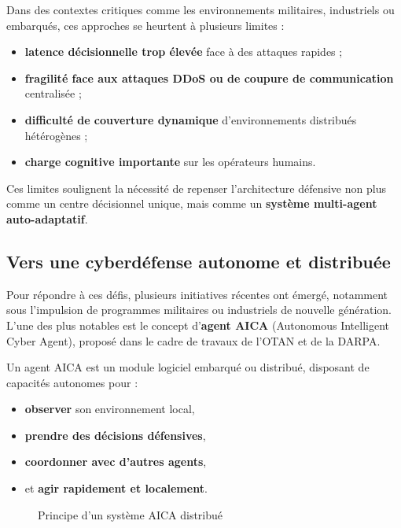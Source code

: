 \documentclass[ twoside,openright,titlepage,numbers=noenddot,headinclude,%
                footinclude=true,cleardoublepage=empty,abstractoff, %
                BCOR=5mm,paper=a4,fontsize=11pt,%
                french,american,%
                ]{scrreprt}
\begin{document}
Dans des contextes critiques comme les environnements militaires, industriels ou embarqués, ces approches se heurtent à plusieurs limites :
\begin{itemize}
    \item \textbf{latence décisionnelle trop élevée} face à des attaques rapides ;
    \item \textbf{fragilité face aux attaques DDoS ou de coupure de communication} centralisée ;
    \item \textbf{difficulté de couverture dynamique} d’environnements distribués hétérogènes ;
    \item \textbf{charge cognitive importante} sur les opérateurs humains.
\end{itemize}

Ces limites soulignent la nécessité de repenser l’architecture défensive non plus comme un centre décisionnel unique, mais comme un \textbf{système multi-agent auto-adaptatif}.

\vspace{0.5em}
\subsection*{Vers une cyberdéfense autonome et distribuée}

Pour répondre à ces défis, plusieurs initiatives récentes ont émergé, notamment sous l’impulsion de programmes militaires ou industriels de nouvelle génération. L’une des plus notables est le concept d’\textbf{agent AICA} (Autonomous Intelligent Cyber Agent), proposé dans le cadre de travaux de l’OTAN et de la DARPA.

Un agent AICA est un module logiciel embarqué ou distribué, disposant de capacités autonomes pour :
\begin{itemize}
    \item \textbf{observer} son environnement local,
    \item \textbf{prendre des décisions défensives},
    \item \textbf{coordonner avec d'autres agents},
    \item et \textbf{agir rapidement et localement}.
\end{itemize}

\begin{figure}[H]
    \centering
    \caption{Principe d’un système AICA distribué}
    \label{fig:aica-system}
\end{figure}
\end{document}
